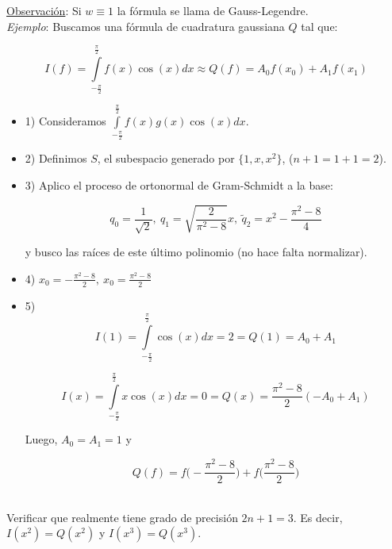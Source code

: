 \underline{Observaci\'on}: Si $w \equiv 1$ la f\'ormula se llama de Gauss-Legendre.\\

\textit{Ejemplo}: Buscamos una f\'ormula de cuadratura gaussiana $Q$ tal que:

$$I(f) = \int \limits_{-\frac{\pi}{2}}^{\frac{\pi}{2}}f(x)\cos(x)dx \approx Q(f) = A_{0}f(x_{0}) + A_{1}f(x_{1})$$

\begin{itemize}
	\item 1) Consideramos $\int \limits_{-\frac{\pi}{2}}^{\frac{\pi}{2}}f(x)g(x)\cos(x)dx $.
	
	\item 2) Definimos $S$, el subespacio generado por $\{1, x, x^{2}\}$, ($n + 1 = 1 + 1 = 2$).
	
	\item 3) Aplico el proceso de ortonormal de Gram-Schmidt a la base:
	
	$$q_{0} = \frac{1}{\sqrt{2}},\ q_{1} = \sqrt{\frac{2}{\pi^{2} - 8}}x,\ \tilde{q}_{2} = x^{2} - \frac{\pi^{2} - 8}{4}$$
	
	y busco las ra\'ices de este \'ultimo polinomio	(no hace falta normalizar).
	
	\item 4) $x_{0} =  -\frac{\pi^{2} - 8}{2},\ x_{0} = \frac{\pi^{2} - 8}{2}$
	
	\item 5) $$I(1) = \int \limits_{-\frac{\pi}{2}}^{\frac{\pi}{2}}\cos(x)dx = 2 = Q(1) = A_{0} + A_{1}$$
	
	$$I(x) = \int \limits_{-\frac{\pi}{2}}^{\frac{\pi}{2}}x\cos(x)dx = 0 = Q(x) = \frac{\pi^{2} - 8}{2}(-A_{0} + A_{1})$$
	
	Luego, $A_{0} = A_{1} = 1$ y
	
	$$Q(f) = f\bigg(-\frac{\pi^{2} - 8}{2}\bigg) + f\bigg(\frac{\pi^{2} - 8}{2}\bigg)$$\\
\end{itemize}

Verificar que realmente tiene grado de precisi\'on $2n + 1 = 3$. Es decir, $I(x^{2}) = Q(x^{2})$ y $I(x^{3}) = Q(x^{3})$.